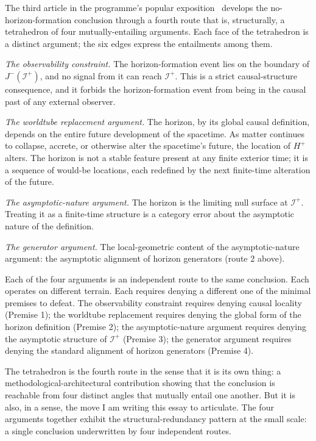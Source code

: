 \documentclass[11pt,a4paper]{article}
\begin{document}
The third article in the programme's popular exposition~\cite{JanzenArticle3} develops the no-horizon-formation conclusion through a fourth route that is, structurally, a tetrahedron of four mutually-entailing arguments. Each face of the tetrahedron is a distinct argument; the six edges express the entailments among them.

\textit{The observability constraint.} The horizon-formation event lies on the boundary of $J^-(\mathscr{I}^+)$, and no signal from it can reach $\mathscr{I}^+$. This is a strict causal-structure consequence, and it forbids the horizon-formation event from being in the causal past of any external observer.

\textit{The worldtube replacement argument.} The horizon, by its global causal definition, depends on the entire future development of the spacetime. As matter continues to collapse, accrete, or otherwise alter the spacetime's future, the location of $H^+$ alters. The horizon is not a stable feature present at any finite exterior time; it is a sequence of would-be locations, each redefined by the next finite-time alteration of the future.

\textit{The asymptotic-nature argument.} The horizon is the limiting null surface at $\mathscr{I}^+$. Treating it as a finite-time structure is a category error about the asymptotic nature of the definition.

\textit{The generator argument.} The local-geometric content of the asymptotic-nature argument: the asymptotic alignment of horizon generators (route 2 above).

Each of the four arguments is an independent route to the same conclusion. Each operates on different terrain. Each requires denying a different one of the minimal premises to defeat. The observability constraint requires denying causal locality (Premise 1); the worldtube replacement requires denying the global form of the horizon definition (Premise 2); the asymptotic-nature argument requires denying the asymptotic structure of $\mathscr{I}^+$ (Premise 3); the generator argument requires denying the standard alignment of horizon generators (Premise 4).

The tetrahedron is the fourth route in the sense that it is its own thing: a methodological-architectural contribution showing that the conclusion is reachable from four distinct angles that mutually entail one another. But it is also, in a sense, the move I am writing this essay to articulate. The four arguments together exhibit the structural-redundancy pattern at the small scale: a single conclusion underwritten by four independent routes.
\end{document}

